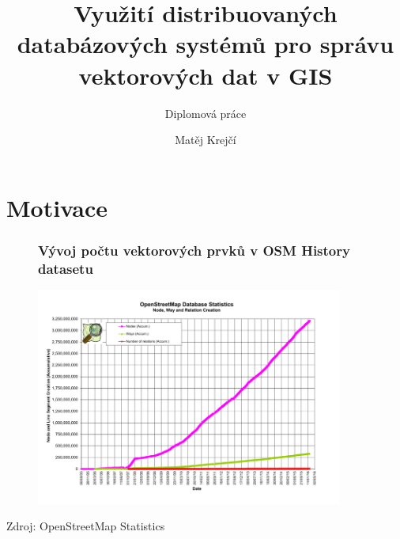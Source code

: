 \documentclass[unicode,bookmarksnumbered]{beamer}
\title[]{Využití distribuovaných databázových systémů pro správu vektorových dat
	v GIS}
\subtitle{Diplomová práce}
\author{Matěj Krejčí}
\institute[ČVUT]{ČESKÉ VYSOKÉ UČENÍ TECHNICKÉ V PRAZE\\
	Katedra geomatiky}
\date[červen 2016]{{\denD} }
\begin{document}
	
	\begin{frame}
		\titlepage %
	\end{frame}
	
	\section{Motivace}
	\begin{frame}
		\begin{figure}
			\frametitle{Vývoj počtu vektorových prvků v OSM History datasetu}
			\centering
			\includegraphics[width=0.9\textwidth]{./img/motivace/osm_graph.png}
			\label{fig:osm_history}
		\end{figure}
		Zdroj: OpenStreetMap Statistics
	\end{frame}
	




\end{document}
